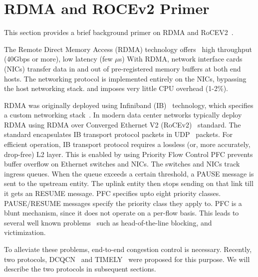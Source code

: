 \section{RDMA and ROCEv2 Primer}

This section provides a brief background primer on RDMA and
RoCEV2~\cite{rocev2}.

The Remote Direct Memory Access (RDMA) technology offers~\cite{dcqcn} high
throughput (40Gbps or more), low latency (few $\mu$s) With RDMA, network
interface cards (NICs) transfer data in and out of pre-registered memory buffers
at both end hosts. The networking protocol is implemented entirely on the NICs,
bypassing the host networking stack.  and imposes very little CPU overhead
(1-2\%). 

RDMA was originally deployed using Infiniband (IB)~\cite{ib-spec} technology,
which specifies a custom networking stack~\cite{ib-hw-spec}. In modern data
center networks typically deploy RDMA using RDMA over Converged Ethernet V2
(RoCEv2)~\cite{rocev2} standard. The standard encapsulates IB transport protocol
packets in UDP~\cite{rcf-udp} packets.  For efficient operation, IB transport
protocol requires a lossless (or, more accurately, drop-free) L2 layer. This is
enabled by using Priority Flow Control PFC prevents buffer overflow on Ethernet
switches and NICs. The switches and NICs track ingress queues. When the queue
exceeds a certain threshold, a PAUSE message is sent to the upstream entity. The
uplink entity then stops sending on that link till it gets an RESUME message.
PFC specifies upto eight priority classes. PAUSE/RESUME messages specify the
priority class they apply to. PFC is a blunt mechanism, since it does not
operate on a per-flow basis. This leads to several well known
problems~\cite{dcqcn,tcp-bolt} such as head-of-the-line blocking, and
victimization. 

To alleviate these problems, end-to-end congestion control is necessary.
Recently, two protocols, DCQCN~\cite{dcqcn} and TIMELY~\cite{timely} were
proposed for this purpose. We will describe the two protocols in subsequent
sections.

